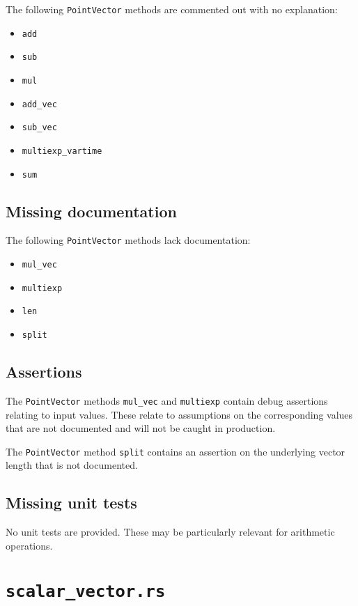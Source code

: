 \documentclass{article}
\begin{document}
The following \texttt{PointVector} methods are commented out with no explanation:
\begin{itemize}
    \item \texttt{add}
    \item \texttt{sub}
    \item \texttt{mul}
    \item \texttt{add\_vec}
    \item \texttt{sub\_vec}
    \item \texttt{multiexp\_vartime}
    \item \texttt{sum}
\end{itemize}


\subsection{Missing documentation}

The following \texttt{PointVector} methods lack documentation:
\begin{itemize}
    \item \texttt{mul\_vec}
    \item \texttt{multiexp}
    \item \texttt{len}
    \item \texttt{split}
\end{itemize}


\subsection{Assertions}

The \texttt{PointVector} methods \texttt{mul\_vec} and \texttt{multiexp} contain debug assertions relating to input values.
These relate to assumptions on the corresponding values that are not documented and will not be caught in production.

The \texttt{PointVector} method \texttt{split} contains an assertion on the underlying vector length that is not documented.


\subsection{Missing unit tests}

No unit tests are provided.
These may be particularly relevant for arithmetic operations.


\section{\texttt{scalar\_vector.rs}}
\end{document}
